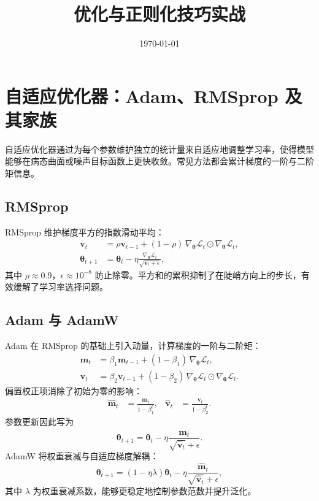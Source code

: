 \documentclass[UTF8,zihao=-4]{ctexart}
\title{优化与正则化技巧实战}
\author{}
\date{\today}
\begin{document}
\maketitle
\tableofcontents
\FloatBarrier

\section{自适应优化器：Adam、RMSprop 及其家族}
自适应优化器通过为每个参数维护独立的统计量来自适应地调整学习率，使得模型能够在病态曲面或噪声目标函数上更快收敛。常见方法都会累计梯度的一阶与二阶矩信息。

\subsection{RMSprop}
RMSprop 维护梯度平方的指数滑动平均：
\begin{align}
  \mathbf{v}_t &= \rho \mathbf{v}_{t-1} + (1-\rho)\,\nabla_{\boldsymbol{\theta}} \mathcal{L}_t \odot \nabla_{\boldsymbol{\theta}} \mathcal{L}_t, \\
  \boldsymbol{\theta}_{t+1} &= \boldsymbol{\theta}_t - \eta \frac{\nabla_{\boldsymbol{\theta}} \mathcal{L}_t}{\sqrt{\mathbf{v}_t + \epsilon}},
\end{align}
其中 $\rho \approx 0.9$，$\epsilon \approx 10^{-8}$ 防止除零。平方和的累积抑制了在陡峭方向上的步长，有效缓解了学习率选择问题。

\subsection{Adam 与 AdamW}
Adam 在 RMSprop 的基础上引入动量，计算梯度的一阶与二阶矩：
\begin{align}
  \mathbf{m}_t &= \beta_1 \mathbf{m}_{t-1} + (1-\beta_1)\,\nabla_{\boldsymbol{\theta}} \mathcal{L}_t, \\
  \mathbf{v}_t &= \beta_2 \mathbf{v}_{t-1} + (1-\beta_2)\,\nabla_{\boldsymbol{\theta}} \mathcal{L}_t \odot \nabla_{\boldsymbol{\theta}} \mathcal{L}_t.
\end{align}
偏置校正项消除了初始为零的影响：
\begin{align}
  \hat{\mathbf{m}}_t &= \frac{\mathbf{m}_t}{1-\beta_1^{t}}, &
  \hat{\mathbf{v}}_t &= \frac{\mathbf{v}_t}{1-\beta_2^{t}}.
\end{align}
参数更新因此写为
\begin{equation}
  \boldsymbol{\theta}_{t+1} = \boldsymbol{\theta}_t - \eta \frac{\hat{\mathbf{m}}_t}{\sqrt{\hat{\mathbf{v}}_t} + \epsilon}.
\end{equation}
AdamW 将权重衰减与自适应梯度解耦：
\begin{equation}
  \boldsymbol{\theta}_{t+1} = (1-\eta \lambda)\boldsymbol{\theta}_t - \eta \frac{\hat{\mathbf{m}}_t}{\sqrt{\hat{\mathbf{v}}_t} + \epsilon},
\end{equation}
其中 $\lambda$ 为权重衰减系数，能够更稳定地控制参数范数并提升泛化。
\end{document}
